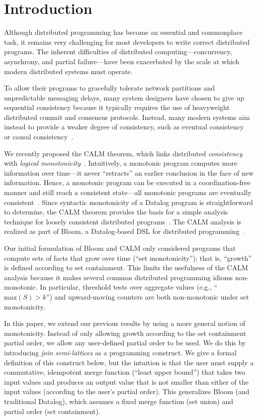 \section{Introduction}
\label{sec:intro}
Although distributed programming has become an essential and commonplace task,
it remains very challenging for most developers to write correct distributed
programs. The inherent difficulties of distributed computing---concurrency,
asynchrony, and partial failure---have been exacerbated by the scale at which
modern distributed systems must operate.

To allow their programs to gracefully tolerate network partitions and
unpredictable messaging delays, many system designers have chosen to give up
sequential consistency because it typically requires the use of heavyweight
distributed commit and consensus protocols. Instead, many modern systems aim
instead to provide a weaker degree of consistency, such as eventual
consistency~\cite{Terry1995} or causal consistency~\cite{Lloyd2011}.

We recently proposed the CALM theorem, which links distributed
\emph{consistency} with \emph{logical
  monotonicity}~\cite{Alvaro2011,Hellerstein2010}. Intuitively, a monotonic
program computes more information over time---it never ``retracts'' an earlier
conclusion in the face of new information. Hence, a monotonic program can be
executed in a coordination-free manner and still reach a consistent state---all
monotonic programs are eventually consistent~\cite{Ameloot2011}.  Since
syntactic monotonicity of a Datalog program is straightforward to determine, the
CALM theorem provides the basis for a simple analysis technique for loosely
consistent distributed programs~\cite{Alvaro2011}. The CALM analysis is realized
as part of Bloom, a Datalog-based DSL for distributed programming~\cite{bloom}.

Our initial formulation of Bloom and CALM only considered programs that compute
sets of facts that grow over time (``set monotonicity''); that is, ``growth'' is
defined according to set containment. This limits the usefulness of the CALM
analysis because it makes several common distributed programming idioms
non-monotonic. In particular, threshold tests over aggregate values (e.g.,
``$\textrm{max}(S) > k$'') and upward-moving counters are both non-monotonic
under set monotonicity.

In this paper, we extend our previous results by using a more general notion of
monotonicity. Instead of only allowing growth according to the set containment
partial order, we allow any user-defined partial order to be used. We do this by
introducing \emph{join semi-lattices} as a programming construct. We give a
formal definition of this construct below, but the intuition is that the user
must supply a commutative, idempotent merge function (``least upper bound'')
that takes two input values and produces an output value that is not smaller
than either of the input values (according to the user's partial order). This
generalizes Bloom (and traditional Datalog), which assumes a fixed merge
function (set union) and partial order (set containment).

